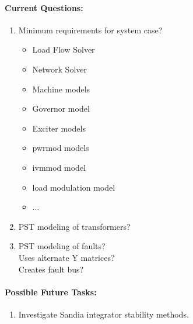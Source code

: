 \documentclass[12pt]{article}
\begin{document}
\begin{multicols}{2}
\paragraph{Current Questions:}
	\begin{enumerate}
	\itemsep0em 
		\item Minimum requirements for system case?
		\begin{itemize}
			\item Load Flow Solver
			\item Network Solver
			\item Machine models
			\item Governor model
			\item Exciter models
			\item pwrmod models
			\item ivmmod model
			\item load modulation model
			\item ...
		\end{itemize}
		\item PST modeling of transformers?
		\item PST modeling of faults? \\
		Uses alternate Y matrices? \\
		Creates fault bus?
	\end{enumerate}

\paragraph{Possible Future Tasks:} %
	\begin{enumerate}
		\item Investigate Sandia integrator stability methods.		
	\end{enumerate}

\vfill\null
\end{multicols}
\end{document}
